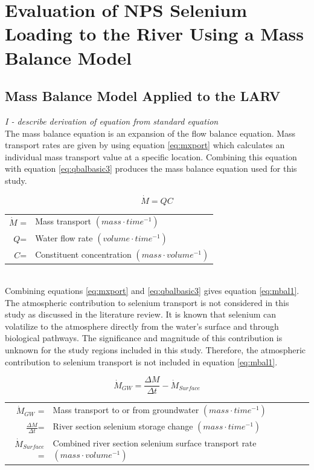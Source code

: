 \chapter{Evaluation of NPS Selenium Loading to the River Using a Mass Balance Model}
\label{chap:MassBalanceModel}

\begin{linenumbers}
\section{Mass Balance Model Applied to the LARV}
\label{sec:AppliedMassModel}

\emph{I - describe derivation of equation from standard equation}\\

The mass balance equation is an expansion of the flow balance equation.  Mass transport rates are given by using equation \ref{eq:mxport} which calculates an individual mass transport value at a specific location.  Combining this equation with equation \ref{eq:qbalbasic3} produces the mass balance equation used for this study.

\begin{equation}
	\dot{M}=QC
	\label{eq:mxport}
\end{equation}
\begin{tabular}{rl}
	$\dot{M}$ =&Mass transport $(mass \cdot time^{-1})$\\
	$Q$=&Water flow rate $(volume \cdot time^{-1})$\\
	$C$=&Constituent concentration $(mass \cdot volume^{-1})$\\
\end{tabular}\\

Combining equations \ref{eq:mxport} and \ref{eq:qbalbasic3} gives equation \ref{eq:mbal1}.  The atmospheric contribution to selenium transport is not considered in this study as discussed in the literature review.  It is known that selenium can volatilize to the atmosphere directly from the water's surface and through biological pathways.  The significance and magnitude of this contribution is unknown for the study regions included in this study.  Therefore, the atmospheric contribution to selenium transport is not included in equation \ref{eq:mbal1}. 

\begin{equation}
	\dot{M}_{GW}=\frac{\Delta M}{\Delta t}-\dot{M}_{Surface}
	\label{eq:mbal1}
\end{equation}
\begin{tabular}{rl}
	$\dot{M}_{GW}$ =&Mass transport to or from groundwater $(mass \cdot time^{-1})$\\
	$\frac{\Delta M}{\Delta t}$=&River section selenium storage change $(mass \cdot time^{-1})$\\
	$\dot{M}_{Surface}$=&Combined river section selenium surface transport rate $(mass \cdot volume^{-1})$\\
\end{tabular}\\


\end{linenumbers}
